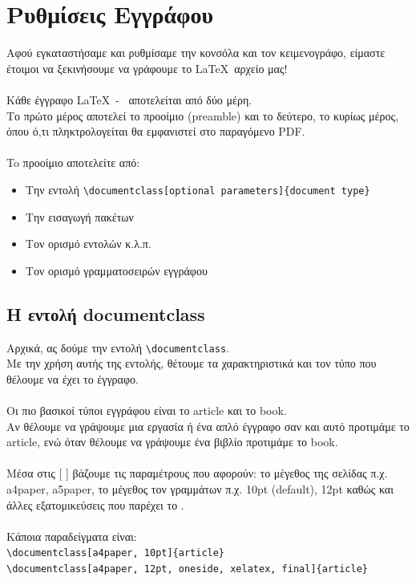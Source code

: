 \documentclass[a4paper, 12pt, oneside, xelatex, final]{article}
\begin{document}
\section{Ρυθμίσεις Εγγράφου}
	\noindent Αφού εγκαταστήσαμε και ρυθμίσαμε την κονσόλα και τον κειμενογράφο, είμαστε έτοιμοι να ξεκινήσουμε να γράφουμε το  \LaTeX\ αρχείο μας!\\
	\\
	Κάθε έγγραφο \LaTeX\ - \XeLaTeX\ αποτελείται από δύο μέρη.\\
	Το πρώτο μέρος αποτελεί το προοίμιο (preamble) και το δεύτερο, το κυρίως μέρος, όπου ό,τι πληκτρολογείται θα εμφανιστεί στο παραγόμενο PDF.\\
	\\
	To προοίμιο αποτελείτε από:
	\begin{itemize}
	\item Την εντολή \verb+\documentclass[optional parameters]{document type}+
	\item Την εισαγωγή πακέτων
	\item Τον ορισμό εντολών κ.λ.π.
	\item Τον ορισμό γραμματοσειρών εγγράφου
	\end{itemize}
	\subsection{Η εντολή documentclass}
	\noindent Αρχικά, ας δούμε την εντολή \verb+\documentclass+.\\
	Με την χρήση αυτής της εντολής, θέτουμε τα χαρακτηριστικά και τον τύπο που θέλουμε να έχει το έγγραφο.\\
	\\
	Οι πιο βασικοί τύποι εγγράφου είναι το article και το book.\\
	Αν θέλουμε να γράψουμε μια εργασία ή ένα απλό έγγραφο σαν και αυτό προτιμάμε το article, ενώ όταν θέλουμε να γράψουμε ένα βιβλίο προτιμάμε το book.\\
	\\
	Μέσα στις [ ] βάζουμε τις παραμέτρους που αφορούν: το μέγεθος της σελίδας π.χ. a4paper, a5paper, το μέγεθος τον γραμμάτων π.χ. 10pt (default), 12pt καθώς και άλλες εξατομικεύσεις που παρέχει το \XeLaTeX.\\
	\\
	Κάποια παραδείγματα είναι:\\
	\verb+\documentclass[a4paper, 10pt]{article}+\\
	\verb+\documentclass[a4paper, 12pt, oneside, xelatex, final]{article}+
	
\end{document}
